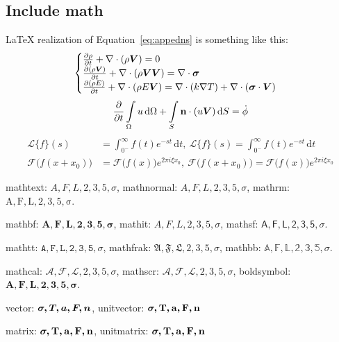 \subsection{Include math}
\LaTeX{} realization of Equation~\ref{eq:appedns} is something like this:
\begin{equation} \label{eq:appedns}
    \begin{cases}
        \frac{\partial \rho}{\partial t} + \nabla\cdot(\rho\boldsymbol{V}) = 0\\
        \frac{\partial (\rho\boldsymbol{V})}{\partial t} + \nabla\cdot(\rho\boldsymbol{V}\boldsymbol{V}) = \nabla\cdot\boldsymbol{\mathsf{\sigma}}\\
        \frac{\partial (\rho E)}{\partial t} + \nabla\cdot(\rho E\boldsymbol{V}) = \nabla\cdot(k\nabla T) + \nabla\cdot(\boldsymbol{\mathsf{\sigma}}\cdot\boldsymbol{V})
    \end{cases}
\end{equation}
\begin{equation}
    \frac{\partial }{\partial t}\int\limits_{\Omega} u \, \mathrm{d}\Omega + \int\limits_{S} \boldsymbol{\mathbf{n}}\cdot(u\boldsymbol{V}) \, \mathrm{d}S = \dot{\phi}
\end{equation}
\[
    \begin{split}
        \mathcal{L} \{f\}(s) &= \int _{0^{-}}^{\infty} f(t) e^{-st} \, \mathrm{d}t, \ 
        \mathscr{L} \{f\}(s) = \int _{0^{-}}^{\infty} f(t) e^{-st} \, \mathrm{d}t\\
        \mathcal{F} {\bigl (} f(x+x_{0}) {\bigr )} &= \mathcal{F} {\bigl (} f(x) {\bigr )} e^{2\pi i\xi x_{0}}, \ 
        \mathscr{F} {\bigl (} f(x+x_{0}) {\bigr )} = \mathscr{F} {\bigl (} f(x) {\bigr )} e^{2\pi i\xi x_{0}}
    \end{split}
\]

mathtext: $A,F,L,2,3,5,\sigma$, mathnormal: $A,F,L,2,3,5,\sigma$, mathrm: $\mathrm{A,F,L,2,3,5,\sigma}$.

mathbf: $\mathbf{A,F,L,2,3,5,\sigma}$, mathit: $\mathit{A,F,L,2,3,5,\sigma}$, mathsf: $\mathsf{A,F,L,2,3,5,\sigma}$.

mathtt: $\mathtt{A,F,L,2,3,5,\sigma}$, mathfrak: $\mathfrak{A,F,L,2,3,5,\sigma}$, mathbb: $\mathbb{A,F,L,2,3,5,\sigma}$.

mathcal: $\mathcal{A,F,L,2,3,5,\sigma}$, mathscr: $\mathscr{A,F,L,2,3,5,\sigma}$, boldsymbol: $\boldsymbol{A,F,L,2,3,5,\sigma}$.

vector: $\boldsymbol{\sigma, T, a, F, n}$, unitvector: $\boldsymbol{\mathbf{\sigma, T, a, F, n}}$

matrix: $\boldsymbol{\mathbf{\sigma, T, a, F, n}}$, unitmatrix: $\boldsymbol{\mathbf{\sigma, T, a, F, n}}$


